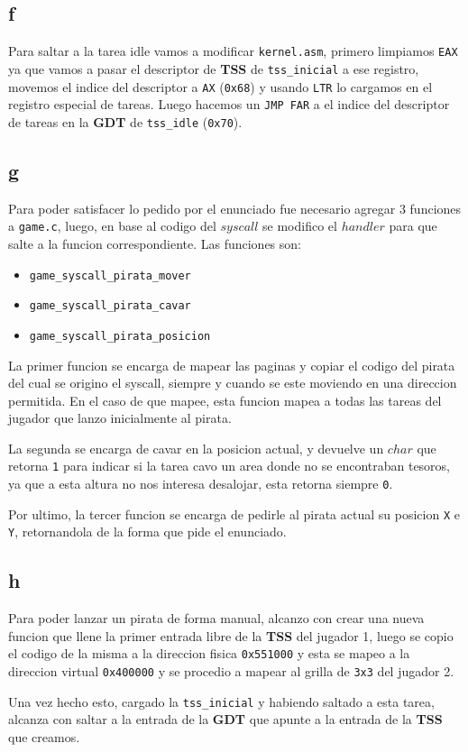\subsection{f}
Para saltar a la tarea idle vamos a modificar \texttt{kernel.asm}, primero limpiamos \texttt{EAX} ya que vamos a pasar el descriptor de \textbf{TSS} de \texttt{tss\_inicial} a ese registro, movemos el indice del descriptor a \texttt{AX} (\texttt{0x68}) y usando \texttt{LTR} lo cargamos en el registro especial de tareas. Luego hacemos un \texttt{JMP FAR} a el indice del descriptor de tareas en la \textbf{GDT} de \texttt{tss\_idle} (\texttt{0x70}).

\subsection{g}
Para poder satisfacer lo pedido por el enunciado fue necesario agregar 3 funciones a \texttt{game.c}, luego, en base al codigo del $syscall$ se modifico el $handler$ para que salte a la funcion correspondiente. Las funciones son:

\begin{itemize}
	\item \texttt{game\_syscall\_pirata\_mover}
	\item \texttt{game\_syscall\_pirata\_cavar}
	\item \texttt{game\_syscall\_pirata\_posicion}
\end{itemize}

La primer funcion se encarga de mapear las paginas y copiar el codigo del pirata del cual se origino el syscall, siempre y cuando se este moviendo en una direccion permitida. En el caso de que mapee, esta funcion mapea a todas las tareas del jugador que lanzo inicialmente al pirata.

La segunda se encarga de cavar en la posicion actual, y devuelve un $char$ que retorna \texttt{1} para indicar si la tarea cavo un area donde no se encontraban tesoros, ya que a esta altura no nos interesa desalojar, esta retorna siempre \texttt{0}.

Por ultimo, la tercer funcion se encarga de pedirle al pirata actual su posicion \texttt{X} e \texttt{Y}, retornandola de la forma que pide el enunciado.

\subsection{h}

Para poder lanzar un pirata de forma manual, alcanzo con crear una nueva funcion que llene la primer entrada libre de la \textbf{TSS} del jugador 1, luego se copio el codigo de la misma a la direccion fisica \texttt{0x551000} y esta se mapeo a la direccion virtual \texttt{0x400000} y se procedio a mapear al grilla de \texttt{3x3} del jugador 2.

Una vez hecho esto, cargado la \texttt{tss\_inicial} y habiendo saltado a esta tarea, alcanza con saltar a la entrada de la \textbf{GDT} que apunte a la entrada de la \textbf{TSS} que creamos.